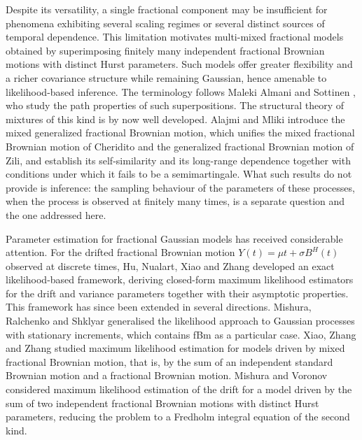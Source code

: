 \documentclass[11pt,reqno]{amsart}
\numberwithin{equation}{section}
\theoremstyle{plain}
\theoremstyle{definition}
\theoremstyle{remark}
\begin{document}
Despite its versatility, a single fractional component may be insufficient for phenomena
exhibiting several scaling regimes or several distinct sources of temporal dependence.
This limitation motivates multi-mixed fractional models obtained by superimposing
finitely many independent fractional Brownian motions with distinct Hurst parameters.
Such models offer greater flexibility and a richer covariance structure while remaining
Gaussian, hence amenable to likelihood-based inference. The terminology follows Maleki
Almani and Sottinen \cite{MS23}, who study the path properties of such superpositions.
The structural theory of mixtures of this kind is by now well developed. Alajmi and Mliki
\cite{AM21} introduce the mixed generalized fractional Brownian motion, which unifies the
mixed fractional Brownian motion of Cheridito and the generalized fractional Brownian
motion of Zili, and establish its self-similarity and its long-range dependence together
with conditions under which it fails to be a semimartingale. What such results do not
provide is inference: the sampling behaviour of the parameters of these processes, when
the process is observed at finitely many times, is a separate question and the one
addressed here.

Parameter estimation for fractional Gaussian models has received considerable attention.
For the drifted fractional Brownian motion $Y(t)=\mu t+\sigma B^{H}(t)$ observed at
discrete times, Hu, Nualart, Xiao and Zhang \cite{HNXZ11} developed an exact
likelihood-based framework, deriving closed-form maximum likelihood estimators for the
drift and variance parameters together with their asymptotic properties. This framework
has since been extended in several directions. Mishura, Ralchenko and Shklyar
\cite{MRS17} generalised the likelihood approach to Gaussian processes with stationary
increments, which contains fBm as a particular case. Xiao, Zhang and Zhang \cite{XZZ11}
studied maximum likelihood estimation for models driven by mixed fractional Brownian
motion, that is, by the sum of an independent standard Brownian motion and a fractional
Brownian motion. Mishura and Voronov \cite{MV15} considered maximum likelihood estimation
of the drift for a model driven by the sum of two independent fractional Brownian motions
with distinct Hurst parameters, reducing the problem to a Fredholm integral equation of
the second kind.
\end{document}
